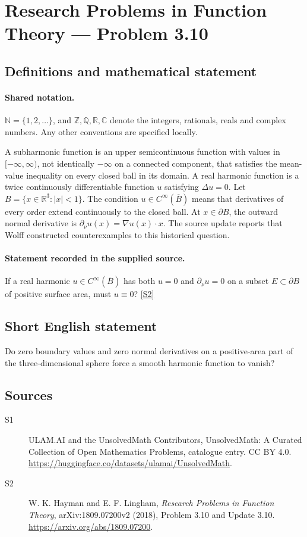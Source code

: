 \documentclass[11pt]{article}
\newcommand{\sref}[2]{\hyperlink{source:#1:#2}{[S#2]}}
\begin{document}
\section{Research Problems in Function Theory — Problem 3.10}\label{statement}

\subsection{Definitions and mathematical statement}

\paragraph{Shared notation.}$\mathbb N=\{1,2,\ldots\}$, and $\mathbb Z,\mathbb Q,\mathbb R,\mathbb C$ denote the integers, rationals, reals and complex numbers. Any other conventions are specified locally.


A subharmonic function is an upper semicontinuous function with values in $[-\infty,\infty)$, not identically $-\infty$ on a connected component, that satisfies the mean-value inequality on every closed ball in its domain. A real harmonic function is a twice continuously differentiable function $u$ satisfying $\Delta u=0$. Let $B=\{x\in\mathbb R^3:|x|<1\}$. The condition $u\in C^\infty(\overline B)$ means that derivatives of every order extend continuously to the closed ball. At $x\in\partial B$, the outward normal derivative is $\partial_\nu u(x)=\nabla u(x)\cdot x$.
The source update reports that Wolff constructed counterexamples to this historical question.
\paragraph{Statement recorded in the supplied source.}
If a real harmonic $u\in C^\infty(\overline B)$ has both $u=0$ and $\partial_\nu u=0$ on a subset $E\subset\partial B$ of positive surface area, must $u\equiv0$? \sref{statement}{2}
\subsection{Short English statement}
Do zero boundary values and zero normal derivatives on a positive-area part of the three-dimensional sphere force a smooth harmonic function to vanish?
\subsection{Sources}
\begin{description}
\item[\hypertarget{source:statement:1}{S1}] ULAM.AI and the UnsolvedMath Contributors, UnsolvedMath: A Curated Collection of Open Mathematics Problems, catalogue entry. CC BY 4.0. \url{https://huggingface.co/datasets/ulamai/UnsolvedMath}.
\item[\hypertarget{source:statement:2}{S2}] W. K. Hayman and E. F. Lingham, \emph{Research Problems in Function Theory}, arXiv:1809.07200v2 (2018), Problem 3.10 and Update 3.10. \url{https://arxiv.org/abs/1809.07200}.
\end{description}
\label{end:statement}
\end{document}

